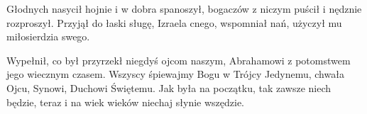 \documentclass[../../../songbook.tex]{subfiles}
\begin{document}
Głodnych nasycił hojnie i w dobra spanoszył, 				 \newline	
bogaczów z niczym puścił i nędznie rozproszył.				 \newline	
Przyjął do łaski sługę, Izraela cnego, 				 \newline	
wspomniał nań, użyczył mu miłosierdzia swego.				 \newline	

Wypełnił, co był przyrzekł niegdyś ojcom naszym, 				 \newline	
Abrahamowi z potomstwem jego wiecznym czasem.				 \newline	
Wszyscy śpiewajmy Bogu w Trójcy Jedynemu, 				 \newline	
chwała Ojcu, Synowi, Duchowi Świętemu.				 \newline	
Jak była na początku, tak zawsze niech będzie, 				 \newline	
teraz i na wiek wieków niechaj słynie wszędzie.				 \newline	
\end{document}
